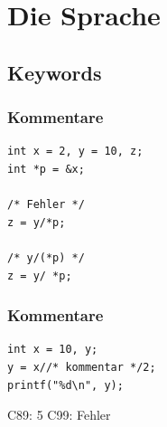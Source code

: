\documentclass[12pt,compress]{beamer}
\begin{document}
\section{Die Sprache}


\subsection{Keywords}


\begin{frame}[fragile]
\frametitle{Kommentare}

\begin{lstlisting}
int x = 2, y = 10, z;
int *p = &x; 

/* Fehler */
z = y/*p;

/* y/(*p) */
z = y/ *p;
\end{lstlisting}
\end{frame}

\begin{frame}[fragile]
\frametitle{Kommentare}

\begin{lstlisting}
int x = 10, y;
y = x//* kommentar */2;
printf("%d\n", y);
\end{lstlisting}

\vfill

\begin{center}
C89: 5 \quad\quad C99: Fehler
\end{center}

\end{frame}
\end{document}
